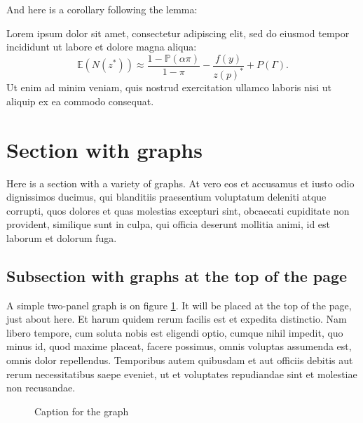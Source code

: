 \documentclass[letterpaper,12pt,leqno]{article}
\newcommand{\pdf}{figures.pdf}
\begin{document}
And here is a corollary following the lemma:

\begin{corollary} Lorem ipsum dolor sit amet, consectetur adipiscing elit, sed do eiusmod tempor incididunt ut labore et dolore magna aliqua:
\begin{equation*}
\mathbb{E}(N(z^*)) \approx \frac{1-\mathbb{P}(\alpha\pi)}{1-\pi}- \frac{f(y)}{z(p)^*} + P(\Gamma).
\end{equation*}
Ut enim ad minim veniam, quis nostrud exercitation ullamco laboris nisi ut aliquip ex ea commodo consequat.\end{corollary}

\section{Section with graphs}\label{s:graphs}

Here is a section with a variety of graphs. At vero eos et accusamus et iusto odio dignissimos ducimus, qui blanditiis praesentium voluptatum deleniti atque corrupti, quos dolores et quas molestias excepturi sint, obcaecati cupiditate non provident, similique sunt in culpa, qui officia deserunt mollitia animi, id est laborum et dolorum fuga. 

\subsection{Subsection with graphs at the top of the page}

A simple two-panel graph is on figure \ref{f:graph1}. It will be placed at the top of the page, just about here. Et harum quidem rerum facilis est et expedita distinctio. Nam libero tempore, cum soluta nobis est eligendi optio, cumque nihil impedit, quo minus id, quod maxime placeat, facere possimus, omnis voluptas assumenda est, omnis dolor repellendus. Temporibus autem quibusdam et aut officiis debitis aut rerum necessitatibus saepe eveniet, ut et voluptates repudiandae sint et molestiae non recusandae.

\begin{figure}[t]
\hfill
{}
\caption{Caption for the graph}
\label{f:graph1}\end{figure}
\end{document}
